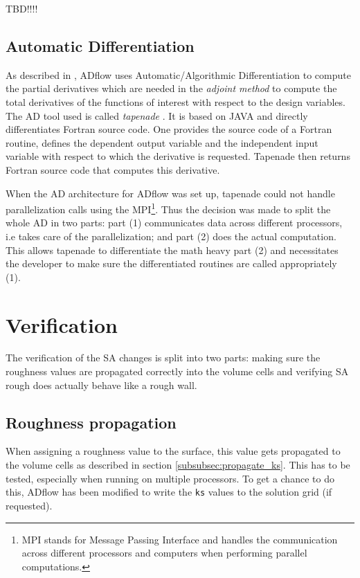 TBD!!!!

\subsection{Automatic Differentiation}
As described in \cite{cm1}, ADflow uses Automatic/Algorithmic Differentiation to
compute the partial derivatives which are needed in the \textit{adjoint method}
to compute the total derivatives of the functions of interest with respect to
the design variables. The AD tool used is called \textit{tapenade}
\cite{tapenade}. It is based on JAVA and directly differentiates Fortran source
code. One provides the source code of a Fortran routine, defines the dependent
output variable and the independent input variable with respect to which the
derivative is requested. Tapenade then returns Fortran source code that
computes this derivative.

When the AD architecture for ADflow was set up, tapenade could not handle
parallelization calls using the MPI\footnote{MPI stands for Message Passing
Interface and handles the communication across different processors and
computers when performing parallel computations.}. Thus the decision was made to
split the whole AD in two parts: part (1) communicates data across different
processors, i.e takes care of the parallelization; and part (2) does the actual
computation. This allows tapenade to differentiate the math heavy part (2) and
necessitates the developer to make sure the differentiated routines are called
appropriately (1).


\section{Verification}
The verification of the SA changes is split into two parts: making sure the
roughness values are propagated correctly into the volume cells and verifying SA
rough does actually behave like a rough wall.

\subsection{Roughness propagation}
When assigning a roughness value to the surface, this value gets propagated to
the volume cells as described in section \ref{subsubsec:propagate_ks}. This has
to be tested, especially when running on multiple processors. To get a chance to
do this, ADflow has been modified to write the \texttt{ks} values to the
solution grid (if requested).

